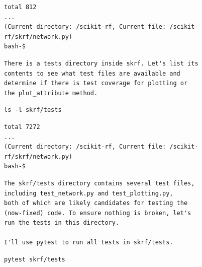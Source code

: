 \documentclass[dandb]{article}
\begin{document}
\begin{flushright}
  \begin{envmessage}
  \begin{lstlisting}[backgroundcolor=\color{green!5!white},frame=none]
total 812
...
(Current directory: /scikit-rf, Current file: /scikit-rf/skrf/network.py)
bash-$
  \end{lstlisting}
  \end{envmessage}
\end{flushright}

\begin{agentmessage}
\begin{lstlisting}[backgroundcolor=\color{blue!5!white},frame=none]
There is a tests directory inside skrf. Let's list its
contents to see what test files are available and
determine if there is test coverage for plotting or
the plot_attribute method.    
\end{lstlisting}

\begin{lstlisting}[backgroundcolor=\color{white!10}]
ls -l skrf/tests  
\end{lstlisting}
\end{agentmessage}

\begin{flushright}
  \begin{envmessage}
  \begin{lstlisting}[backgroundcolor=\color{green!5!white},frame=none]
total 7272
...
(Current directory: /scikit-rf, Current file: /scikit-rf/skrf/network.py)
bash-$
  \end{lstlisting}
  \end{envmessage}
\end{flushright}

\begin{agentmessage}
\begin{lstlisting}[backgroundcolor=\color{blue!5!white},frame=none]
The skrf/tests directory contains several test files, 
including test_network.py and test_plotting.py,
both of which are likely candidates for testing the
(now-fixed) code. To ensure nothing is broken, let's
run the tests in this directory.

I'll use pytest to run all tests in skrf/tests.
\end{lstlisting}

\begin{lstlisting}[backgroundcolor=\color{white!10}]
pytest skrf/tests
\end{lstlisting}
\end{agentmessage}
\end{document}
